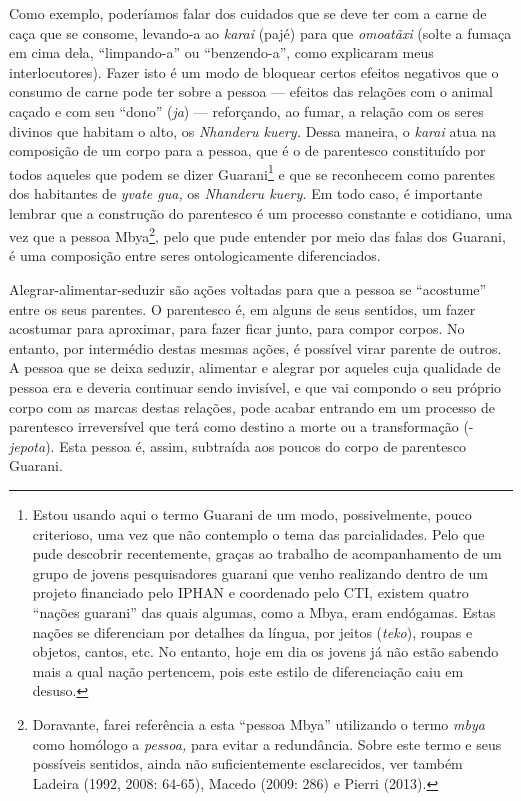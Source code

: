 Como exemplo, poderíamos falar dos cuidados que se deve ter com a carne
de caça que se consome, levando-a ao \emph{karai} (pajé) para que
\emph{omoatãxi} (solte a fumaça em cima dela, ``limpando-a'' ou
``benzendo-a'', como explicaram meus interlocutores). Fazer isto é um
modo de bloquear certos efeitos negativos que o consumo de carne pode
ter sobre a pessoa --- efeitos das relações com o animal caçado e com
seu ``dono'' (\emph{ja}) --- reforçando, ao fumar, a relação com os
seres divinos que habitam o alto, os \emph{Nhanderu kuery.} Dessa
maneira, o \emph{karai} atua na composição de um corpo para a pessoa,
que é o de parentesco constituído por todos aqueles que podem se dizer
Guarani\footnote{Estou usando aqui o termo Guarani de um modo,
  possivelmente, pouco criterioso, uma vez que não contemplo o tema das
  parcialidades. Pelo que pude descobrir recentemente, graças ao
  trabalho de acompanhamento de um grupo de jovens pesquisadores guarani
  que venho realizando dentro de um projeto financiado pelo IPHAN e
  coordenado pelo CTI, existem quatro ``nações guarani'' das quais
  algumas, como a Mbya, eram endógamas. Estas nações se diferenciam por
  detalhes da língua, por jeitos (\emph{teko}), roupas e objetos,
  cantos, etc. No entanto, hoje em dia os jovens já não estão sabendo
  mais a qual nação pertencem, pois este estilo de diferenciação caiu em
  desuso.} e que se reconhecem como parentes dos habitantes de
\emph{yvate gua,} os \emph{Nhanderu kuery.} Em todo caso, é importante
lembrar que a construção do parentesco é um processo constante e
cotidiano, uma vez que a pessoa Mbya\footnote{Doravante, farei
  referência a esta ``pessoa Mbya'' utilizando o termo \emph{mbya} como
  homólogo a \emph{pessoa,} para evitar a redundância. Sobre este termo
  e seus possíveis sentidos, ainda não suficientemente esclarecidos, ver
  também Ladeira (1992, 2008: 64-65), Macedo (2009: 286) e Pierri
  (2013).}, pelo que pude entender por meio das falas dos Guarani, é uma
composição entre seres ontologicamente diferenciados.

Alegrar-alimentar-seduzir são ações voltadas para que a pessoa se
``acostume'' entre os seus parentes. O parentesco é, em alguns de seus
sentidos, um fazer acostumar para aproximar, para fazer ficar junto,
para compor corpos. No entanto, por intermédio destas mesmas ações, é
possível virar parente de outros. A pessoa que se deixa seduzir,
alimentar e alegrar por aqueles cuja qualidade de pessoa era e deveria
continuar sendo invisível, e que vai compondo o seu próprio corpo com as
marcas destas relações, pode acabar entrando em um processo de
parentesco irreversível que terá como destino a morte ou a transformação
(-\emph{jepota}). Esta pessoa é, assim, subtraída aos poucos do corpo de
parentesco Guarani.


